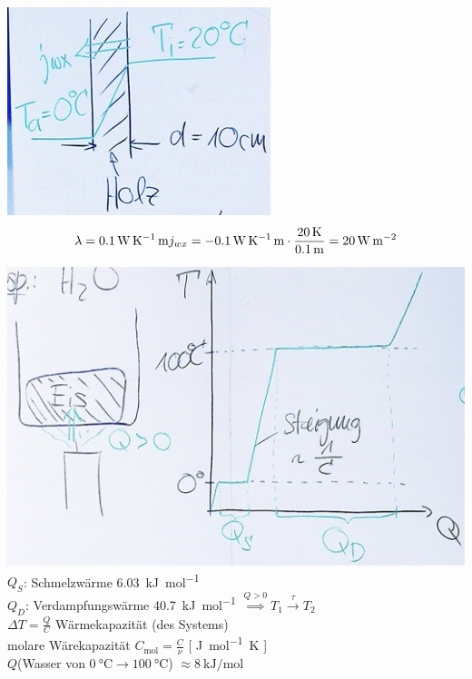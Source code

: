 \begin{bsp*}
	\includegraphics{Bild142}
	\[
		\lambda = \SI{0.1}{\watt\per\kelvin\metre} \\
		j_{wx} = \SI{-0.1}{\watt\per\kelvin\metre} \cdot \frac{\SI{20}{\kelvin}}{\SI{0.1}{\metre}} = \SI{20}{\watt\per\metre\squared}
	\]
\end{bsp*}
\begin{bsp*}[ note = \ce{H2O} ]
	\includegraphics{Bild143} \\
	$Q_S$: Schmelzwärme \SI{6.03}{\kilo\joule\per\mole} \\
	$Q_D$: Verdampfungswärme \SI{40.7}{\kilo\joule\per\mole}
	$\overset{Q > 0}{\implies} T_1 \overset{\tau}{\rightarrow} T_2$ \\
	$\Delta T = \frac{Q}{C}$ Wärmekapazität (des Systems) \\
	molare Wärekapazität $C_{\si{\mole}} = \frac{C}{\nu}$ [ \si{\joule\per\mole\kelvin} ] \\
	$Q$(Wasser von $\SI{0}{\celsius} \rightarrow \SI{100}{\celsius}$) $\approx \SI{8}{\kilo\joule\per\mole}$
\end{bsp*}

